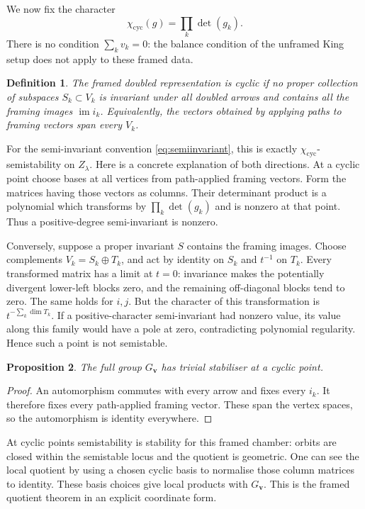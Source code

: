 \documentclass[11pt,a4paper]{article}
\numberwithin{equation}{section}
\newtheorem{definition}{Definition}[section]
\newtheorem{proposition}[definition]{Proposition}
\theoremstyle{definition}
\newcommand{\im}{\operatorname{im}}
\newcommand{\vv}{\mathbf v}
\begin{document}
We now fix the character
\begin{equation}\label{eq:cycliccharacter}
 \chi_{\mathrm{cyc}}(g)=\prod_k\det(g_k).
\end{equation}
There is no condition $\sum_kv_k=0$: the balance condition of the
unframed King setup does not apply to these framed data.

\begin{definition}
The framed doubled representation is cyclic if no proper collection
of subspaces $S_k\subset V_k$ is invariant under all doubled arrows
and contains all the framing images $\im i_k$. Equivalently, the
vectors obtained by applying paths to framing vectors span every $V_k$.
\end{definition}

For the semi-invariant convention \eqref{eq:semiinvariant}, this is
exactly $\chi_{\mathrm{cyc}}$-semistability on $Z_\lambda$.
Here is a concrete explanation of both directions.
At a cyclic point choose bases at all vertices from path-applied
framing vectors. Form the matrices having those vectors as columns.
Their determinant product is a polynomial which transforms by
$\prod_k\det(g_k)$ and is nonzero at that point. Thus a positive-degree
semi-invariant is nonzero.

Conversely, suppose a proper invariant $S$ contains the framing
images. Choose complements $V_k=S_k\oplus T_k$, and act by identity
on $S_k$ and $t^{-1}$ on $T_k$. Every transformed matrix has a limit
at $t=0$: invariance makes the potentially divergent lower-left
blocks zero, and the remaining off-diagonal blocks tend to zero.
The same holds for $i,j$. But the character of this transformation is
$t^{-\sum_k\dim T_k}$. If a positive-character semi-invariant had
nonzero value, its value along this family would have a pole at zero,
contradicting polynomial regularity. Hence such a point is not semistable.

\begin{proposition}\label{prop:free}
The full group $G_\vv$ has trivial stabiliser at a cyclic point.
\end{proposition}
\begin{proof}
An automorphism commutes with every arrow and fixes every $i_k$.
It therefore fixes every path-applied framing vector. These span
the vertex spaces, so the automorphism is identity everywhere.
\end{proof}

At cyclic points semistability is stability for this framed chamber:
orbits are closed within the semistable locus and the quotient is
geometric. One can see the local quotient by using a chosen cyclic
basis to normalise those column matrices to identity. These basis
choices give local products with $G_\vv$. This is the framed
quotient theorem in an explicit coordinate form.
\end{document}
